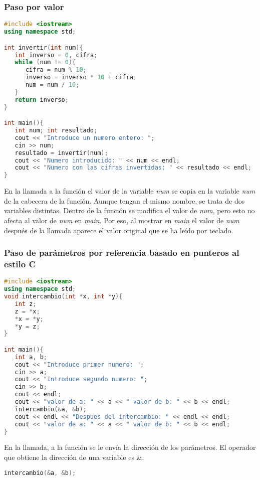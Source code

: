 \subsubsection{Paso por valor}

\begin{lstlisting}[language=C++]
#include <iostream>
using namespace std;

int invertir(int num){
   int inverso = 0, cifra;
   while (num != 0){
      cifra = num % 10;
      inverso = inverso * 10 + cifra;
      num = num / 10;
   }
   return inverso;
}

int main(){   
   int num; int resultado;
   cout << "Introduce un numero entero: ";
   cin >> num;
   resultado = invertir(num);
   cout << "Numero introducido: " << num << endl;
   cout << "Numero con las cifras invertidas: " << resultado << endl;
}
\end{lstlisting}

En la llamada a la función el valor de la variable \emph{num} se copia en la variable \emph{num} de la cabecera de la función. Aunque tengan el mismo nombre, se trata de dos variables distintas. Dentro de la función se modifica el valor de \emph{num}, pero esto no afecta al valor de \emph{num} en \emph{main}. Por eso, al mostrar en \emph{main} el valor de \emph{num} después de la llamada aparece el valor original que se ha leído por teclado.

\subsubsection{Paso de parámetros por referencia basado en punteros al estilo C}
\begin{lstlisting}[language=C++]
 #include <iostream>
using namespace std;
void intercambio(int *x, int *y){
   int z;                      
   z = *x;
   *x = *y;
   *y = z;
}

int main(){
   int a, b;
   cout << "Introduce primer numero: ";
   cin >> a;
   cout << "Introduce segundo numero: ";
   cin >> b;
   cout << endl;
   cout << "valor de a: " << a << " valor de b: " << b << endl;
   intercambio(&a, &b); 
   cout << endl << "Despues del intercambio: " << endl << endl;
   cout << "valor de a: " << a << " valor de b: " << b << endl;
}
\end{lstlisting}

En la llamada, a la función se le envía la dirección de los parámetros. El operador que obtiene la dirección de una variable es \&.

\begin{lstlisting}[language=C++]
intercambio(&a, &b);  
\end{lstlisting}

